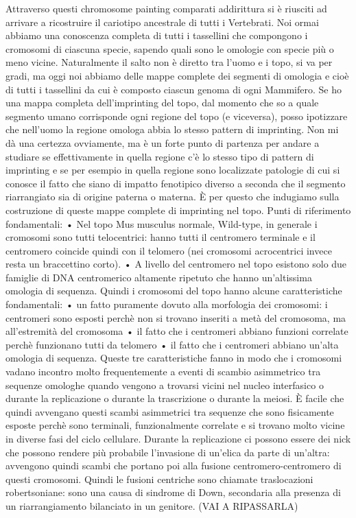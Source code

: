 \documentclass[11pt]{book}
\begin{document}
Attraverso questi chromosome painting comparati addirittura si è riusciti ad arrivare a ricostruire il cariotipo ancestrale di tutti i Vertebrati. 
Noi ormai abbiamo una conoscenza completa di tutti i tassellini che compongono i cromosomi di ciascuna specie, sapendo quali sono le omologie con specie più o meno vicine. 
Naturalmente il salto non è diretto tra l’uomo e i topo, si va per gradi, ma oggi noi abbiamo delle mappe complete dei segmenti di omologia e cioè di tutti i tassellini da cui è composto ciascun genoma di ogni Mammifero.
Se ho una mappa completa dell’imprinting del topo, dal momento che so a quale segmento umano corrisponde ogni regione del topo (e viceversa), posso ipotizzare che nell’uomo la regione omologa abbia lo stesso pattern di imprinting. Non mi dà una certezza ovviamente, ma è un forte punto di partenza per andare a studiare se effettivamente in quella regione c’è lo stesso tipo di pattern di imprinting e se per esempio in quella regione sono localizzate patologie di cui si conosce il fatto che siano di impatto fenotipico diverso a seconda che il segmento riarrangiato sia di origine paterna o materna.
È per questo che indugiamo sulla costruzione di queste mappe complete di imprinting nel topo.
Punti di riferimento fondamentali:
    • Nel topo Mus musculus normale, Wild-type, in generale i cromosomi sono tutti telocentrici: hanno tutti il centromero terminale e il centromero coincide quindi con il telomero (nei cromosomi acrocentrici invece resta un braccettino corto).
    • A livello del centromero nel topo esistono solo due famiglie di DNA centromerico altamente ripetuto che hanno un’altissima omologia di sequenza.
Quindi i cromosomi del topo hanno alcune caratteristiche fondamentali: 
    • un fatto puramente dovuto alla morfologia dei cromosomi: i centromeri sono esposti perchè non si trovano inseriti a metà del cromosoma, ma all’estremità del cromosoma
    • il fatto che i centromeri abbiano funzioni correlate perchè funzionano tutti da telomero
    • il fatto che i centromeri abbiano un’alta omologia di sequenza.
Queste  tre caratteristiche fanno in modo che i cromosomi vadano incontro molto frequentemente a eventi di scambio asimmetrico tra sequenze omologhe quando vengono a trovarsi vicini nel nucleo interfasico o durante la replicazione o durante la trascrizione o durante la meiosi.
È facile che quindi avvengano questi scambi asimmetrici tra sequenze che sono fisicamente esposte perchè sono terminali, funzionalmente correlate e si trovano molto vicine in diverse fasi del ciclo cellulare.
Durante la replicazione ci possono essere dei nick che possono rendere più probabile l’invasione di un’elica da parte di un’altra: avvengono quindi scambi che portano poi alla fusione centromero-centromero di questi cromosomi. Quindi le fusioni centriche sono chiamate traslocazioni robertsoniane: sono una causa di sindrome di Down, secondaria alla presenza di un riarrangiamento bilanciato in un genitore. (VAI A RIPASSARLA)
\end{document}
